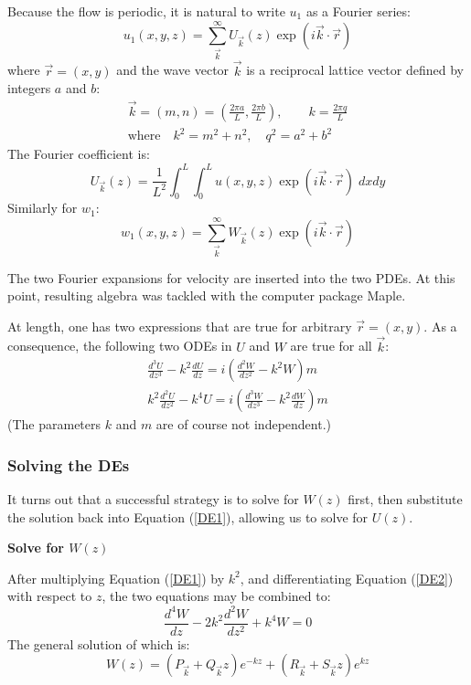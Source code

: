 \documentclass[12pt, a4paper, twoside, openright]{book}
\begin{document}
Because the flow is periodic, it is natural to write $u_1$ as a Fourier series:
\begin{equation}
u_1(x,y,z) = \sum_{\vec{k}}^{\infty} U_{\vec{k}}(z) \exp(i \vec{k}\cdot \vec{r})
\end{equation}
where $\vec{r} = (x,y)$ and the wave vector $\vec{k}$ is a reciprocal lattice vector defined by integers $a$ and $b$:
\begin{gather}
\vec{k} = (m,n) = \left( \frac{ 2\pi a }{L} , \frac{ 2\pi b }{L}  \right),
 \qquad k = \frac{2 \pi q}{L} \\
\text{where} \quad k^2 = m^2 + n^2,  \quad  q^2 = a^2 + b^2
\end{gather}
The Fourier coefficient is:
\begin{equation}
U_{\vec{k}}(z) = \frac{1}{L^2} \int_0^L \int_0^L u(x,y,z) \exp(i \vec{k} \cdot \vec{r})
\;dxdy
\end{equation}
Similarly for $w_1$:
\begin{equation}
w_1(x,y,z) = \sum_{\vec{k}}^{\infty} W_{\vec{k}}(z) \exp(i \vec{k}\cdot \vec{r})
\end{equation}

The two Fourier expansions for velocity are inserted into the two PDEs.  At this point, resulting algebra was tackled with the computer package Maple.

At length, one has two expressions that are true for arbitrary $\vec{r} = (x,y)$.  As a consequence, the following two ODEs in $U$ and $W$ are true for all $\vec{k}$:
\begin{gather}
\frac{d^3 U}{dz^3} - k^2 \frac{d U}{dz} = i \left( \frac{d^2 W}{dz^2} - k^2 W \right) m 
\label{DE1} \\
k^2 \frac{d^2 U}{dz^2} - k^4 U = i \left( \frac{d^3 W}{dz^3} - k^2 \frac{dW}{dz} \right) m
\label{DE2}
\end{gather}
(The parameters $k$ and $m$ are of course not independent.)

\subsubsection*{Solving the DEs}

It turns out that a successful strategy is to solve for $W(z)$ first, then substitute the solution back into Equation (\ref{DE1}), allowing us to solve for $U(z)$.

\vspace{1em}
\textbf{Solve for $W(z)$}

After multiplying Equation (\ref{DE1}) by $k^2$, and  differentiating  Equation (\ref{DE2}) with respect to $z$, the two equations may be combined to:
\begin{equation}
\frac{d^4 W}{dz} - 2 k^2 \frac{d^2 W}{dz^2} + k^4 W = 0
\end{equation}
The general solution of which is:
\begin{equation}
W(z) = \left( P_{\vec{k}} + Q_{\vec{k}} z \right) e^{-kz} +
\left( R_{\vec{k}} + S_{\vec{k}} z \right) e^{kz}
\end{equation}
\end{document}
